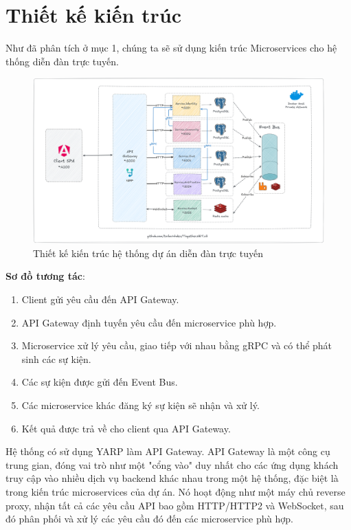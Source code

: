 \documentclass[../index.tex]{subfiles}
\begin{document}
    \section{Thiết kế kiến trúc}
    Như đã phân tích ở mục 1, chúng ta sẽ sử dụng kiến trúc Microservices cho hệ
    thống diễn đàn trực tuyến.

    \begin{figure}[H]
        \centering
        \includegraphics[width=0.95\linewidth,angle=270,scale=1.4]{../figures/architecture.png}
        \caption{Thiết kế kiến trúc hệ thống dự án diễn đàn trực tuyến}
        \label{fig:architecture}
    \end{figure}

    \textbf{Sơ đồ tương tác}:
    \begin{enumerate}
        \item Client gửi yêu cầu đến API Gateway.

        \item API Gateway định tuyến yêu cầu đến microservice phù hợp.

        \item Microservice xử lý yêu cầu, giao tiếp với nhau bằng gRPC và có thể
            phát sinh các sự kiện.

        \item Các sự kiện được gửi đến Event Bus.

        \item Các microservice khác đăng ký sự kiện sẽ nhận và xử lý.

        \item Kết quả được trả về cho client qua API Gateway.
    \end{enumerate}

    Hệ thống có sử dụng YARP làm API Gateway. API Gateway là một công cụ trung gian,
    đóng vai trò như một "cổng vào" duy nhất cho các ứng dụng khách truy cập vào
    nhiều dịch vụ backend khác nhau trong một hệ thống, đặc biệt là trong kiến trúc
    microservices của dự án. Nó hoạt động như một máy chủ reverse proxy, nhận tất
    cả các yêu cầu API bao gồm HTTP/HTTP2 và WebSocket, sau đó phân phối và xử
    lý các yêu cầu đó đến các microservice phù hợp.
\end{document}
